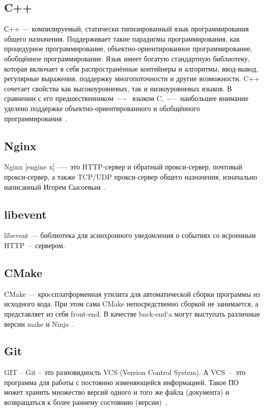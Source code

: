 \subsection{C++}
С++ --- компилируемый, статически типизированный язык программирования общего назначения.
Поддерживает такие парадигмы программирования, как процедурное программирование,
объектно-ориентированное программирование, обобщённое программирование.
Язык имеет богатую стандартную библиотеку, которая включает в себя
распространённые контейнеры и алгоритмы, ввод-вывод, регулярные выражения,
поддержку многопоточности и другие возможности. C++ сочетает свойства как
высокоуровневых, так и низкоуровневых языков. В сравнении с его предшественником~—-~
языком C,~-—~наибольшее внимание уделено поддержке объектно-ориентированного и
обобщённого программирования~\cite{cpp}.


\subsection{Nginx}
Nginx [engine x] —-- это HTTP-сервер и обратный прокси-сервер, почтовый
прокси-сервер, а также TCP/UDP прокси-сервер общего назначения, изначально
написанный Игорем Сысоевым~\cite{nginx}.

\subsection{libevent}
libevent --- библиотека для асинхронного уведомления о событиях со всроенным
HTTP~--~сервером.

\subsection{CMake}

CMake — кроcсплатформенная утилита для автоматической сборки программы из
исходного кода. При этом сама CMake непосредственно сборкой не занимается,
а представляет из себя front-end. В качестве back-end`a могут выступать
различные версии make и Ninja~\cite{cmake}.

\subsection{Git}
GIT – Git – это разновидность VCS (Version Control System).
А VCS~–~это программа для работы с постоянно изменяющейся информацией. Такое ПО
может хранить множество версий одного и того же файла (документа) и возвращаться
к более раннему состоянию (версии)~\cite{git}.

